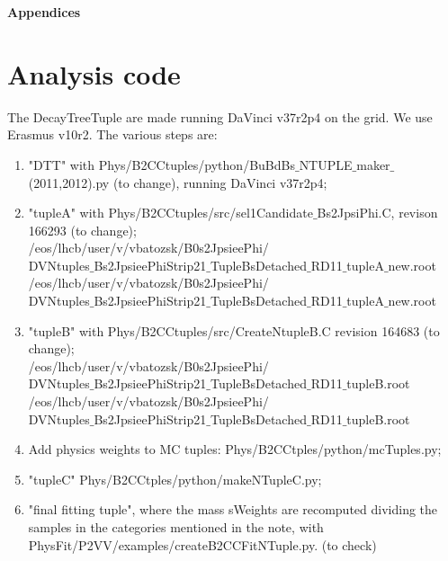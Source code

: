 
\clearpage

{\noindent\normalfont\bfseries\Large Appendices}

\appendix

\section{Analysis code}\label{sec:app:AnaCode}
 The DecayTreeTuple are made running DaVinci v37r2p4 on the grid. We use Erasmus v10r2. The various steps are:
 \begin{enumerate}
  \item "DTT" with Phys/B2CCtuples/python/BuBdBs$\_$NTUPLE$\_$maker$\_$(2011,2012).py (to change), running DaVinci v37r2p4;
  \item "tupleA" with Phys/B2CCtuples/src/sel1Candidate$\_$Bs2JpsiPhi.C, revison 166293 (to change);\\
  /eos/lhcb/user/v/vbatozsk/B0s2JpsieePhi/\\
  DVNtuples$\_$Bs2JpsieePhiStrip21$\_$TupleBsDetached$\_$RD11$\_$tupleA$\_$new.root\\
 /eos/lhcb/user/v/vbatozsk/B0s2JpsieePhi/\\
 DVNtuples$\_$Bs2JpsieePhiStrip21$\_$TupleBsDetached$\_$RD11$\_$tupleA$\_$new.root
  \item "tupleB" with Phys/B2CCtuples/src/CreateNtupleB.C revision 164683 (to change);\\
 /eos/lhcb/user/v/vbatozsk/B0s2JpsieePhi/\\
 DVNtuples$\_$Bs2JpsieePhiStrip21$\_$TupleBsDetached$\_$RD11$\_$tupleB.root\\
 /eos/lhcb/user/v/vbatozsk/B0s2JpsieePhi/\\
 DVNtuples$\_$Bs2JpsieePhiStrip21$\_$TupleBsDetached$\_$RD11$\_$tupleB.root
 \item  Add physics weights to MC tuples: Phys/B2CCtples/python/mcTuples.py;
 \item  "tupleC" Phys/B2CCtples/python/makeNTupleC.py;
 \item  "final fitting tuple", where the mass sWeights are recomputed dividing the samples in the categories mentioned in the note, with PhysFit/P2VV/examples/createB2CCFitNTuple.py. (to check)
 \end{enumerate}

